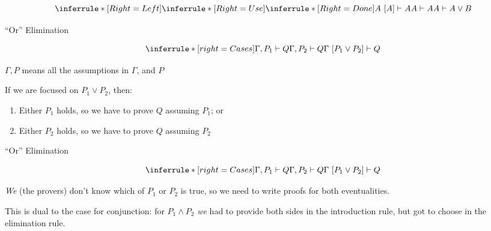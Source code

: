 \documentclass[xetex,aspectratio=169,14pt,hyperref={pdfpagelabels=true,pdflang={en-GB}}]{beamer}
\begin{document}
\begin{frame}

  \bigskip

  \begin{displaymath}
    \inferrule* [Right=Left]
    {\inferrule* [Right=Use]
      {\inferrule* [Right=Done]
        { } {A~[A] \vdash A}
      }
      {A \vdash A}
    }
    {A \vdash A \lor B}
  \end{displaymath}
\end{frame}

\begin{frame}[t]
  {``Or'' Elimination}

  \begin{displaymath}
    \inferrule* [right=Cases]
    {\Gamma, P_1 \vdash Q \\ \Gamma, P_2 \vdash Q}
    {\Gamma~[P_1 \lor P_2] \vdash Q}
  \end{displaymath}

  \textcolor{black!60}{$\Gamma, P$ means all the assumptions in $\Gamma$, and $P$}

  \bigskip
  \pause

  If we are focused on $P_1 \lor P_2$, then:
  \begin{enumerate}
  \item Either $P_1$ holds, so we have to prove $Q$ assuming $P_1$; or
  \item Either $P_2$ holds, so we have to prove $Q$ assuming $P_2$
  \end{enumerate}
\end{frame}

\begin{frame}[t]
  {``Or'' Elimination}

  \begin{displaymath}
    \inferrule* [right=Cases]
    {\Gamma, P_1 \vdash Q \\ \Gamma, P_2 \vdash Q}
    {\Gamma~[P_1 \lor P_2] \vdash Q}
  \end{displaymath}

  \pause
  \bigskip

  \emph{We} (the provers) don't know which of $P_1$ or $P_2$ is true,
  so we need to write proofs for both eventualities.

  \pause
  \bigskip

  This is dual to the case for conjunction: for $P_1 \land P_2$
  \emph{we} had to provide both sides in the introduction rule, but
  got to choose in the elimination rule.
\end{frame}
\end{document}
